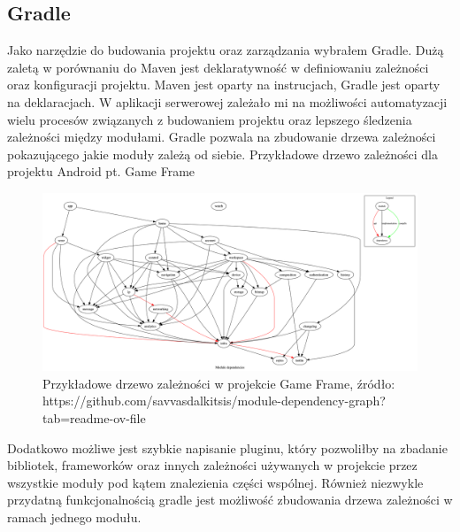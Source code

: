 \subsection{Gradle}\label{subsec:uzyte-technologie-gradle}
Jako narzędzie do budowania projektu oraz zarządzania wybrałem Gradle.
Dużą zaletą w porównaniu do Maven jest deklaratywność w definiowaniu zależności oraz konfiguracji projektu.
Maven jest oparty na instrucjach, Gradle jest oparty na deklaracjach.
\cite{mavenDefinitiveGuide}
\cite{gradleForAndroid}
W aplikacji serwerowej zależało mi na możliwości automatyzacji wielu procesów związanych z budowaniem projektu oraz lepszego śledzenia zależności między modułami.
Gradle pozwala na zbudowanie drzewa zależności pokazującego jakie moduły zależą od siebie.
Przykładowe drzewo zależności dla projektu Android pt. \href{https://github.com/savvasdalkitsis/module-dependency-graph?tab=readme-ov-file}{} Game Frame
\begin{figure}[H]
    \centering
    \clearpage
    \includegraphics[width=15cm,keepaspectratio]{rysunki/module_graph.png}
    \caption{Przykładowe drzewo zależności w projekcie Game Frame, źródło: https://github.com/savvasdalkitsis/module-dependency-graph?tab=readme-ov-file}
    \label{fig:gameframe-deps-tree}
\end{figure}
Dodatkowo możliwe jest szybkie napisanie pluginu, który pozwoliłby na zbadanie bibliotek, frameworków oraz innych zależności używanych w projekcie przez wszystkie moduły pod kątem znalezienia części wspólnej.
Również niezwykle przydatną funkcjonalnością gradle jest możliwość zbudowania drzewa zależności w ramach jednego modułu.
\cite{gradleDepsTree}
